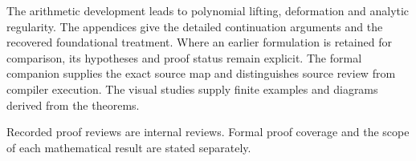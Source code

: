 The arithmetic development leads to polynomial lifting, deformation and analytic regularity. The appendices give the detailed continuation arguments and the recovered foundational treatment. Where an earlier formulation is retained for comparison, its hypotheses and proof status remain explicit. The formal companion supplies the exact source map and distinguishes source review from compiler execution. The visual studies supply finite examples and diagrams derived from the theorems.

Recorded proof reviews are internal reviews. Formal proof coverage and the scope of each mathematical result are stated separately.
\clearpage
